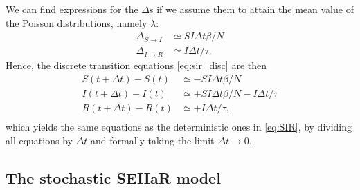 We can find expressions for the $\Delta$s if we assume them to attain the mean value of the Poisson distributions, namely $\lambda$:
\begin{subequations}
	\begin{align}
		\Delta_{S\to I} &\simeq SI \Delta t \beta/N  \\
		\Delta_{I\to R} &\simeq I \Delta t/\tau.
	\end{align}
\end{subequations}
Hence, the discrete transition equations \eqref{eq:sir_disc} are then  
\begin{subequations}
	\begin{align}
		S(t + \Delta t) - S(t) &\simeq  - SI \Delta t \beta/N\\
		I(t + \Delta t) - I(t)&\simeq  + SI \Delta t \beta/N - I \Delta t/\tau \\
		R(t + \Delta t) -  R(t)&\simeq + I \Delta t/\tau, \\
	\end{align}
\end{subequations}
which yields the same equations as the deterministic ones in \eqref{eq:SIR}, by dividing all equations by $\Delta t$ and formally taking the limit $\Delta t \to 0$.

\subsection{The stochastic SEIIaR model}

